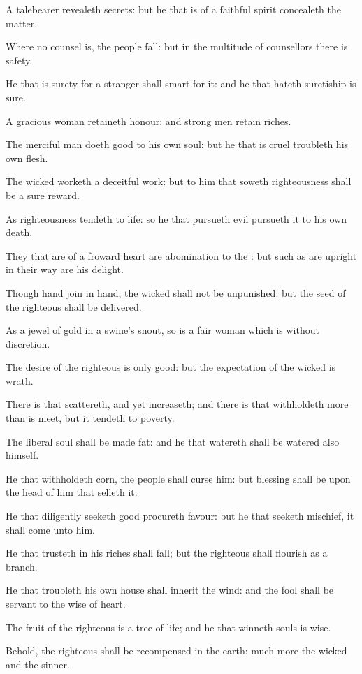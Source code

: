 \verse A talebearer revealeth secrets: but he that is of a faithful spirit concealeth the matter.

\verse Where no counsel is, the people fall: but in the multitude of counsellors there is safety.

\verse He that is surety for a stranger shall smart for it: and he that hateth suretiship is sure.

\verse A gracious woman retaineth honour: and strong men retain riches.

\verse The merciful man doeth good to his own soul: but he that is cruel troubleth his own flesh.

\verse The wicked worketh a deceitful work: but to him that soweth righteousness shall be a sure reward.

\verse As righteousness tendeth to life: so he that pursueth evil pursueth it to his own death.

\verse They that are of a froward heart are abomination to the \LORD: but such as are upright in their way are his delight.

\verse Though hand join in hand, the wicked shall not be unpunished: but the seed of the righteous shall be delivered.

\verse As a jewel of gold in a swine's snout, so is a fair woman which is without discretion.

\verse The desire of the righteous is only good: but the expectation of the wicked is wrath.

\verse There is that scattereth, and yet increaseth; and there is that withholdeth more than is meet, but it tendeth to poverty.

\verse The liberal soul shall be made fat: and he that watereth shall be watered also himself.

\verse He that withholdeth corn, the people shall curse him: but blessing shall be upon the head of him that selleth it.

\verse He that diligently seeketh good procureth favour: but he that seeketh mischief, it shall come unto him.

\verse He that trusteth in his riches shall fall; but the righteous shall flourish as a branch.

\verse He that troubleth his own house shall inherit the wind: and the fool shall be servant to the wise of heart.

\verse The fruit of the righteous is a tree of life; and he that winneth souls is wise.

\verse Behold, the righteous shall be recompensed in the earth: much more the wicked and the sinner.


